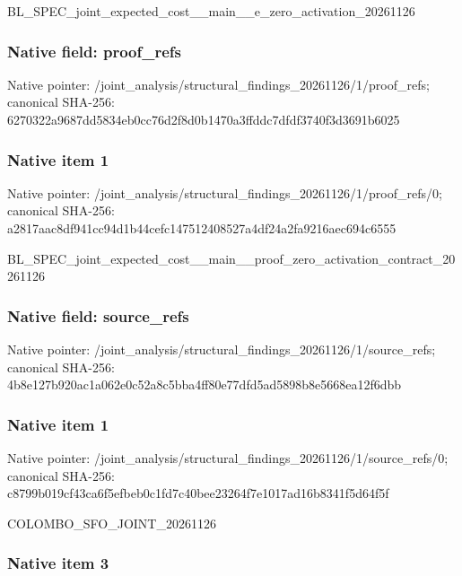 \documentclass[10pt,a4paper]{article}
\begin{document}
BL\_SPEC\_joint\_expected\_c\allowbreak{}ost\_\_main\_\_e\_zero\_activa\allowbreak{}tion\_20261126


\subsubsection{Native field: proof\_refs}


Native pointer: /joint\_analysis/structur\allowbreak{}al\_findings\_20261126/1/p\allowbreak{}roof\_refs; canonical SHA-256: 6270322a9687dd5834eb0cc7\allowbreak{}6d2f8d0b1470a3ffddc7dfdf\allowbreak{}3740f3d3691b6025



\subsubsection{Native item 1}


Native pointer: /joint\_analysis/structur\allowbreak{}al\_findings\_20261126/1/p\allowbreak{}roof\_refs/0; canonical SHA-256: a2817aac8df941cc94d1b44c\allowbreak{}efc147512408527a4df24a2f\allowbreak{}a9216aec694c6555


BL\_SPEC\_joint\_expected\_c\allowbreak{}ost\_\_main\_\_proof\_zero\_ac\allowbreak{}tivation\_contract\_202611\allowbreak{}26


\subsubsection{Native field: source\_refs}


Native pointer: /joint\_analysis/structur\allowbreak{}al\_findings\_20261126/1/s\allowbreak{}ource\_refs; canonical SHA-256: 4b8e127b920ac1a062e0c52a\allowbreak{}8c5bba4ff80e77dfd5ad5898\allowbreak{}b8e5668ea12f6dbb



\subsubsection{Native item 1}


Native pointer: /joint\_analysis/structur\allowbreak{}al\_findings\_20261126/1/s\allowbreak{}ource\_refs/0; canonical SHA-256: c8799b019cf43ca6f5efbeb0\allowbreak{}c1fd7c40bee23264f7e1017a\allowbreak{}d16b8341f5d64f5f


COLOMBO\_SFO\_JOINT\_20261126


\subsubsection{Native item 3}
\end{document}
